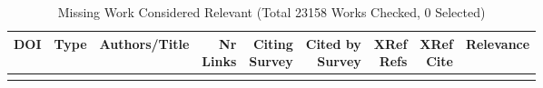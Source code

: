 {\scriptsize
\begin{longtable}{p{5cm}lp{11cm}rrrrrr}
\caption{Missing Work Considered Relevant (Total 23158 Works Checked, 0 Selected)}\\ \toprule
DOI & Type & Authors/Title & \shortstack{Nr\\Links} & \shortstack{Citing\\Survey} & \shortstack{Cited by\\Survey} & \shortstack{XRef\\Refs} & \shortstack{XRef\\Cite} & Relevance\\ \midrule\endhead
\bottomrule
\endfoot
\end{longtable}
}

